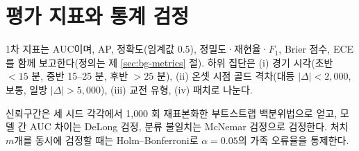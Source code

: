
\section{평가 지표와 통계 검정}
\label{sec:setup-metrics}

1차 지표는 AUC이며, AP, 정확도(임계값 0.5), 정밀도·재현율·$F_1$, Brier 점수, ECE를 함께 보고한다(정의는 제 \ref{sec:bg-metrics} 절). 하위 집단은 (i) 경기 시각(초반 $<15$ 분, 중반 15--25 분, 후반 $>25$ 분), (ii) 온셋 시점 골드 격차(대등 $|\Delta| < 2{,}000$, 보통, 일방 $|\Delta| > 5{,}000$), (iii) 교전 유형, (iv) 패치로 나눈다.

신뢰구간은 세 시드 각각에서 1{,}000 회 재표본화한 부트스트랩 백분위법으로 얻고, 모델 간 AUC 차이는 DeLong 검정, 분류 불일치는 McNemar 검정으로 검정한다. 처치 $m$개를 동시에 검정할 때는 Holm--Bonferroni로 $\alpha = 0.05$의 가족 오류율을 통제한다.

